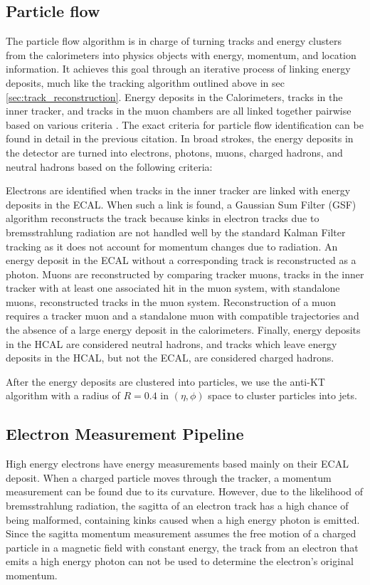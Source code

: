   \subsection{Particle flow} \label{sec:particle_flow}
    The particle flow algorithm is in charge of turning tracks and energy clusters from the calorimeters into physics objects with energy, momentum, and location information. It achieves this goal through an iterative process of linking energy deposits, much like the tracking algorithm outlined above in sec \ref{sec:track_reconstruction}. Energy deposits in the Calorimeters, tracks in the inner tracker, and tracks in the muon chambers are all linked together pairwise based on various criteria \cite[sec. 4]{cms_particleflow}. The exact criteria for particle flow identification can be found in detail in the previous citation. In broad strokes, the energy deposits in the detector are turned into electrons, photons, muons, charged hadrons, and neutral hadrons based on the following criteria:

    Electrons are identified when tracks in the inner tracker are linked with energy deposits in the ECAL. When such a link is found, a Gaussian Sum Filter (GSF) \cite{cms_gsf} algorithm reconstructs the track because kinks in electron tracks due to bremsstrahlung radiation are not handled well by the standard Kalman Filter tracking as it does not account for momentum changes due to radiation. An energy deposit in the ECAL without a corresponding track is reconstructed as a photon. Muons are reconstructed by comparing tracker muons, tracks in the inner tracker with at least one associated hit in the muon system, with standalone muons, reconstructed tracks in the muon system. Reconstruction of a muon requires a tracker muon and a standalone muon with compatible trajectories and the absence of a large energy deposit in the calorimeters. Finally, energy deposits in the HCAL are considered neutral hadrons, and tracks which leave energy deposits in the HCAL, but not the ECAL, are considered charged hadrons.

    After the energy deposits are clustered into particles, we use the anti-KT algorithm with a radius of $R=0.4$ in $(\eta, \phi)$ space to cluster particles into jets.\cite{cms_jet_performance} 


  \subsection{Electron Measurement Pipeline} \label{sec:electron_measurement_pipeline}
    High energy electrons have energy measurements based mainly on their ECAL deposit. When a charged particle moves through the tracker, a momentum measurement can be found due to its curvature. However, due to the likelihood of bremsstrahlung radiation, the sagitta of an electron track has a high chance of being malformed, containing kinks caused when a high energy photon is emitted. Since the sagitta momentum measurement assumes the free motion of a charged particle in a magnetic field with constant energy, the track from an electron that emits a high energy photon can not be used to determine the electron's original momentum.

